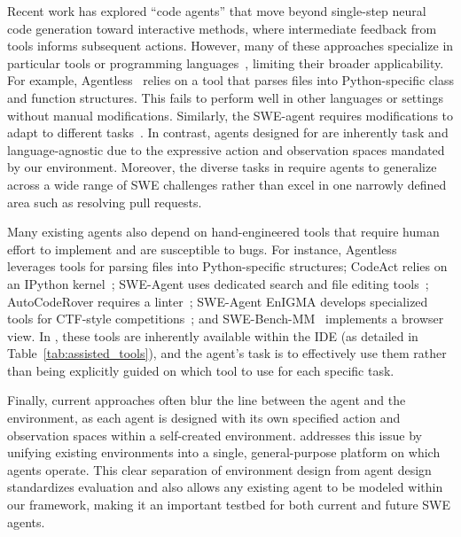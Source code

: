 Recent work has explored “code agents” that move beyond single-step neural code generation toward interactive methods, where intermediate feedback from tools informs subsequent actions. However, many of these approaches specialize in particular tools or programming languages~\cite{Jin2024FromLT,yang2024swebenchmultimodalaisystems}, limiting their broader applicability. For example, Agentless~\cite{xia2024agentlessdemystifyingllmbasedsoftware} relies on a tool that parses files into Python-specific class and function structures.
This fails to perform well in other languages or settings~\cite{yang2024swebenchmultimodalaisystems} without manual modifications. Similarly, the SWE-agent requires modifications to adapt to different tasks~\cite{abramovich2024enigmaenhancedinteractivegenerative,yang2024swebenchmultimodalaisystems}. In contrast, agents designed for \ours{} are inherently task and language-agnostic due to the expressive action and observation spaces mandated by our environment. Moreover, the diverse tasks in \bench{} require agents to generalize across a wide range of SWE challenges rather than excel in one narrowly defined area such as resolving pull requests.

Many existing agents also depend on hand-engineered tools that require human effort to implement and are susceptible to bugs. For instance, Agentless~\cite{xia2024agentlessdemystifyingllmbasedsoftware} leverages tools for parsing files into Python-specific structures; CodeAct relies on an IPython kernel~\cite{wang2024executablecodeactionselicit}; SWE-Agent uses dedicated search and file editing tools~\cite{yang2024sweagentagentcomputerinterfacesenable}; AutoCodeRover requires a linter~\cite{zhang2024autocoderoverautonomousprogramimprovement}; SWE-Agent EnIGMA develops specialized tools for CTF-style competitions~\cite{abramovich2024enigmaenhancedinteractivegenerative}; and SWE-Bench-MM~\cite{yang2024swebenchmultimodalaisystems} implements a browser view. 
In \ours{}, these tools are inherently available within the IDE (as detailed in  Table~\ref{tab:assisted_tools}), and the agent's task is to effectively use them rather than being explicitly guided on which tool to use for each specific task.

Finally, current approaches often blur the line between the agent and the environment, as each agent is designed with its own specified action and observation spaces within a self-created environment. \Ours{} addresses this issue by unifying existing environments into a single, general-purpose platform on which agents operate. This clear separation of environment design from agent design standardizes evaluation and also allows any existing agent to be modeled within our framework, making it an important testbed for both current and future SWE agents.


